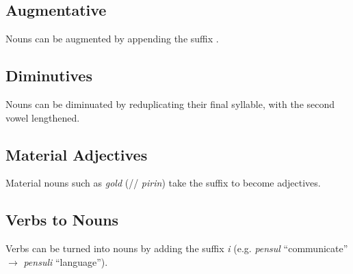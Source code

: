 \documentclass[main.tex]{subfiles}
\begin{document}
\subsection{Augmentative}
Nouns can be augmented by appending the suffix .

\subsection{Diminutives}
Nouns can be diminuated by reduplicating their final syllable, with the second
vowel lengthened.

\subsection{Material Adjectives}
Material nouns such as \textit{gold} (// \textit{pirin}) take
the suffix  to become adjectives.

\subsection{Verbs to Nouns}
Verbs can be turned into nouns by adding the suffix \textit{i} (e.g. \textit{pensul} ``communicate'' $\rightarrow$ \textit{pensuli} ``language'').
\end{document}
